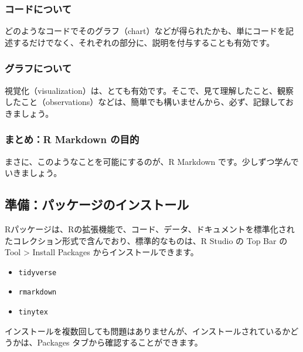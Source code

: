 \documentclass[
]{bxjsbook}
\providecommand{\tightlist}{%
  \setlength{\itemsep}{0pt}\setlength{\parskip}{0pt}}
\theoremstyle{definition}
\theoremstyle{definition}
\theoremstyle{definition}
\theoremstyle{definition}
\theoremstyle{remark}
\begin{document}
\hypertarget{ux30b3ux30fcux30c9ux306bux3064ux3044ux3066}{%
\subsubsection{コードについて}\label{ux30b3ux30fcux30c9ux306bux3064ux3044ux3066}}

どのようなコードでそのグラフ（chart）などが得られたかも、単にコードを記述するだけでなく、それぞれの部分に、説明を付与することも有効です。

\hypertarget{ux30b0ux30e9ux30d5ux306bux3064ux3044ux3066}{%
\subsubsection{グラフについて}\label{ux30b0ux30e9ux30d5ux306bux3064ux3044ux3066}}

視覚化（visualization）は、とても有効です。そこで、見て理解したこと、観察したこと（observations）などは、簡単でも構いませんから、必ず、記録しておきましょう。

\hypertarget{ux307eux3068ux3081r-markdown-ux306eux76eeux7684}{%
\subsubsection{まとめ：R Markdown の目的}\label{ux307eux3068ux3081r-markdown-ux306eux76eeux7684}}

まさに、このようなことを可能にするのが、R Markdown です。少しずつ学んでいきましょう。

\hypertarget{ux6e96ux5099ux30d1ux30c3ux30b1ux30fcux30b8ux306eux30a4ux30f3ux30b9ux30c8ux30fcux30eb}{%
\subsection{準備：パッケージのインストール}\label{ux6e96ux5099ux30d1ux30c3ux30b1ux30fcux30b8ux306eux30a4ux30f3ux30b9ux30c8ux30fcux30eb}}

Rパッケージは、Rの拡張機能で、コード、データ、ドキュメントを標準化されたコレクション形式で含んでおり、標準的なものは、R Studio の Top Bar の Tool \textgreater{} Install Packages からインストールできます。

\begin{itemize}
\tightlist
\item
  \texttt{tidyverse}
\item
  \texttt{rmarkdown}
\item
  \texttt{tinytex}
\end{itemize}

インストールを複数回しても問題はありませんが、インストールされているかどうかは、Packages タブから確認することができます。
\end{document}
